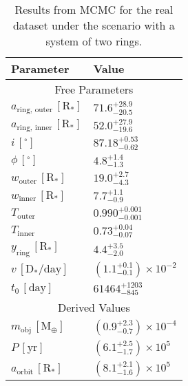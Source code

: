 \documentclass[letter]{aa} %
\begin{document}
\begingroup
\renewcommand{\arraystretch}{1.5}
\begin{table}[tp]
\centering
\begin{threeparttable}
    \caption{Results from MCMC for the real dataset under the scenario with a system of two rings.}
\begin{tabular}{p{4cm} p{4cm}}    \hline
    \textbf{Parameter} & {\textbf{Value}}\\
    \hline
    \hline
    \multicolumn{2}{c}{Free Parameters}\\    
    \hline
    $a_{\ensuremath{\mathrm{ring, \,outer}}} \, [\ensuremath{\mathrm{R_*}}]$ & $71.6_{-20.5}^{+28.9}$ \\
    $a_{\ensuremath{\mathrm{ring, \,inner}}} \, [\ensuremath{\mathrm{R_*}}]$ & $52.0_{-19.6}^{+27.9}$ \\
    $i \, [^\circ]$ & $87.18_{-0.62}^{+0.53}$ \\
    $\phi \, [^\circ]$ & $4.8_{-1.3}^{+1.4}$ \\
    $w_{\ensuremath{\mathrm{outer}}} \, [\ensuremath{\mathrm{R_*}}]$ & $19.0_{-4.3}^{+2.7}$\\
    $w_{\ensuremath{\mathrm{inner}}} \, [\ensuremath{\mathrm{R_*}}]$ & ${7.7}_{-0.9}^{+1.1}$ \\
    $T_{\ensuremath{\mathrm{outer}}}$ & $0.990_{-0.001}^{+0.001}$ \\
    $T_{\ensuremath{\mathrm{inner}}}$ & $0.73_{-0.07}^{+0.04}$ \\
    $y_{\ensuremath{\mathrm{ring}}} \, [\ensuremath{\mathrm{R_*}}]$ & $4.4_{-2.0}^{+3.5}$ \\
    $v \, [\ensuremath{\mathrm{D_*/ day}}]$ & $\left(1.1_{-0.1}^{+0.1}\right)\times10^{-2}$ \\
    $t_0 \, [\mathrm{day}]$ & $61464_{-845}^{+1203}$ \\
    \hline
    \multicolumn{2}{c}{Derived Values}\\
    \hline

    $m_{\ensuremath{\mathrm{obj}}} \, [\mathrm{M}_\oplus]$ & $\left ( 0.9_{-0.7}^{+2.3}\right ) \times 10^{-4}$ \\
    $P \, [\mathrm{yr}]$ & $\left ( 6.1_{-1.7}^{+2.5}\right )\times 10^5$  \\
    $a_{\mathrm{orbit}} \, [\ensuremath{\mathrm{R_*}}]$ & $\left(8.1_{-1.6}^{+2.1}\right)\times10^5$\\
    \hline
    \end{tabular}
    \label{tab:mcmc_result}
\end{threeparttable}
\end{table}
\endgroup
\end{document}
